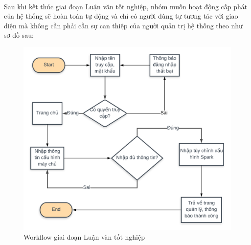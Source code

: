 \documentclass[11pt,a4paper]{article}
\begin{document}
\\
Sau khi kết thúc giai đoạn Luận văn tốt nghiệp, nhóm muốn hoạt động cấp phát của hệ thống sẽ hoàn toàn tự động và chỉ có người dùng tự tương tác với giao diện mà không cần phải cần sự can thiệp của người quản trị hệ thống theo như sơ đồ sau:\\
\begin{figure}
    \centering
    \includegraphics[width=16cm]{fig/luanvan_diagram.png}
    \caption{Workflow giai đoạn Luận văn tốt nghiệp }
    \label{fig:luanvan_diagram}
\end{figure}
\end{document}
